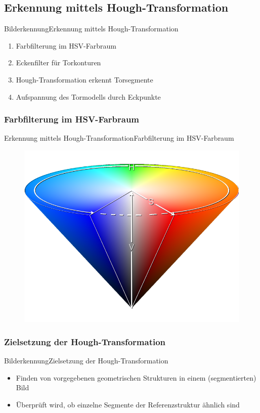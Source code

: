 \documentclass{beamer}
\begin{document}
\subsection{Erkennung mittels Hough-Transformation}
\begin{frame}{Bilderkennung}{Erkennung mittels Hough-Transformation}
\begin{enumerate}
    \item Farbfilterung im HSV-Farbraum
    \item Eckenfilter für Torkonturen
    \item Hough-Transformation erkennt Torsegmente
    \item Aufspannung des Tormodells durch Eckpunkte
\end{enumerate}
\end{frame}

\subsubsection{Farbfilterung im HSV-Farbraum}
\begin{frame}{Erkennung mittels Hough-Transformation}{Farbfilterung im HSV-Farbraum}
\begin{figure}[htp]
\centering
\includegraphics[scale=0.3]{750px-HSV_cone.png}
\end{figure}
\end{frame}

\subsubsection{Zielsetzung der Hough-Transformation}
\begin{frame}{Bilderkennung}{Zielsetzung der Hough-Transformation}
\begin{itemize}
    \item Finden von vorgegebenen geometrischen Strukturen in einem (segmentierten) Bild
    \item Überprüft wird, ob einzelne Segmente der Referenzstruktur ähnlich sind
\end{itemize}
\end{frame}
\end{document}
